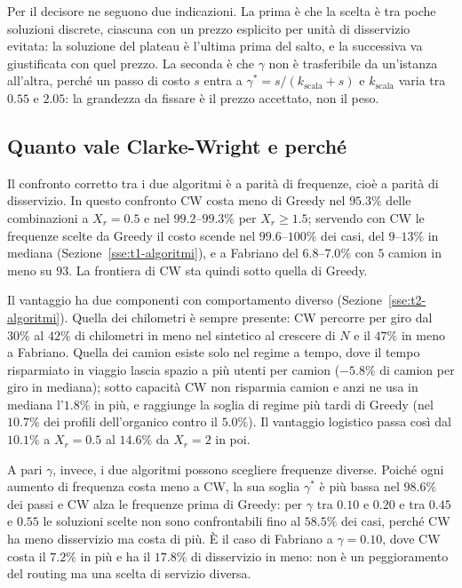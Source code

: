 Per il decisore ne seguono due indicazioni. La prima è che la scelta è tra poche soluzioni discrete, ciascuna con un prezzo esplicito per unità di disservizio evitata: la soluzione del plateau è l'ultima prima del salto, e la successiva va giustificata con quel prezzo. La seconda è che $\gamma$ non è trasferibile da un'istanza all'altra, perché un passo di costo $s$ entra a $\gamma^*=s/(k_{\mathrm{scala}}+s)$ e $k_{\mathrm{scala}}$ varia tra $0.55$ e $2.05$: la grandezza da fissare è il prezzo accettato, non il peso.

\subsection{Quanto vale Clarke-Wright e perché}\label{sse:disc-algoritmi}

Il confronto corretto tra i due algoritmi è a parità di frequenze, cioè a parità di disservizio. In questo confronto CW costa meno di Greedy nel $95.3\%$ delle combinazioni a $X_r=0.5$ e nel $99.2$--$99.3\%$ per $X_r\ge1.5$; servendo con CW le frequenze scelte da Greedy il costo scende nel $99.6$--$100\%$ dei casi, del $9$--$13\%$ in mediana (Sezione~\ref{sse:t1-algoritmi}), e a Fabriano del $6.8$--$7.0\%$ con $5$ camion in meno su $93$. La frontiera di CW sta quindi sotto quella di Greedy.

Il vantaggio ha due componenti con comportamento diverso (Sezione~\ref{sse:t2-algoritmi}). Quella dei chilometri è sempre presente: CW percorre per giro dal $30\%$ al $42\%$ di chilometri in meno nel sintetico al crescere di $N$ e il $47\%$ in meno a Fabriano. Quella dei camion esiste solo nel regime a tempo, dove il tempo risparmiato in viaggio lascia spazio a più utenti per camion ($-5.8\%$ di camion per giro in mediana); sotto capacità CW non risparmia camion e anzi ne usa in mediana l'$1.8\%$ in più, e raggiunge la soglia di regime più tardi di Greedy (nel $10.7\%$ dei profili dell'organico contro il $5.0\%$). Il vantaggio logistico passa così dal $10.1\%$ a $X_r=0.5$ al $14.6\%$ da $X_r=2$ in poi.

A pari $\gamma$, invece, i due algoritmi possono scegliere frequenze diverse. Poiché ogni aumento di frequenza costa meno a CW, la sua soglia $\gamma^*$ è più bassa nel $98.6\%$ dei passi e CW alza le frequenze prima di Greedy: per $\gamma$ tra $0.10$ e $0.20$ e tra $0.45$ e $0.55$ le soluzioni scelte non sono confrontabili fino al $58.5\%$ dei casi, perché CW ha meno disservizio ma costa di più. È il caso di Fabriano a $\gamma=0.10$, dove CW costa il $7.2\%$ in più e ha il $17.8\%$ di disservizio in meno: non è un peggioramento del routing ma una scelta di servizio diversa.

